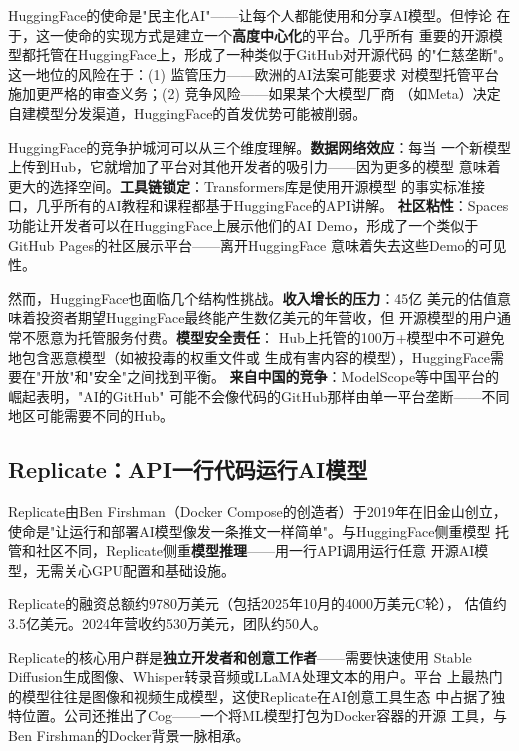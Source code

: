 \begin{whybox}
HuggingFace的使命是"民主化AI"——让每个人都能使用和分享AI模型。但悖论
在于，这一使命的实现方式是建立一个\textbf{高度中心化}的平台。几乎所有
重要的开源模型都托管在HuggingFace上，形成了一种类似于GitHub对开源代码
的"仁慈垄断"。这一地位的风险在于：(1) 监管压力——欧洲的AI法案可能要求
对模型托管平台施加更严格的审查义务；(2) 竞争风险——如果某个大模型厂商
（如Meta）决定自建模型分发渠道，HuggingFace的首发优势可能被削弱。
\end{whybox}

HuggingFace的竞争护城河可以从三个维度理解。\textbf{数据网络效应}：每当
一个新模型上传到Hub，它就增加了平台对其他开发者的吸引力——因为更多的模型
意味着更大的选择空间。\textbf{工具链锁定}：Transformers库是使用开源模型
的事实标准接口，几乎所有的AI教程和课程都基于HuggingFace的API讲解。
\textbf{社区粘性}：Spaces功能让开发者可以在HuggingFace上展示他们的AI
Demo，形成了一个类似于GitHub Pages的社区展示平台——离开HuggingFace
意味着失去这些Demo的可见性。

然而，HuggingFace也面临几个结构性挑战。\textbf{收入增长的压力}：45亿
美元的估值意味着投资者期望HuggingFace最终能产生数亿美元的年营收，但
开源模型的用户通常不愿意为托管服务付费。\textbf{模型安全责任}：
Hub上托管的100万+模型中不可避免地包含恶意模型（如被投毒的权重文件或
生成有害内容的模型），HuggingFace需要在"开放"和"安全"之间找到平衡。
\textbf{来自中国的竞争}：ModelScope等中国平台的崛起表明，"AI的GitHub"
可能不会像代码的GitHub那样由单一平台垄断——不同地区可能需要不同的Hub。

\subsection{Replicate：API一行代码运行AI模型}
\label{subsec:replicate}

Replicate由Ben Firshman（Docker Compose的创造者）于2019年在旧金山创立，
使命是"让运行和部署AI模型像发一条推文一样简单"。与HuggingFace侧重模型
托管和社区不同，Replicate侧重\textbf{模型推理}——用一行API调用运行任意
开源AI模型，无需关心GPU配置和基础设施。

Replicate的融资总额约9780万美元（包括2025年10月的4000万美元C轮），
估值约3.5亿美元。2024年营收约530万美元，团队约50人。

Replicate的核心用户群是\textbf{独立开发者和创意工作者}——需要快速使用
Stable Diffusion生成图像、Whisper转录音频或LLaMA处理文本的用户。平台
上最热门的模型往往是图像和视频生成模型，这使Replicate在AI创意工具生态
中占据了独特位置。公司还推出了Cog——一个将ML模型打包为Docker容器的开源
工具，与Ben Firshman的Docker背景一脉相承。

